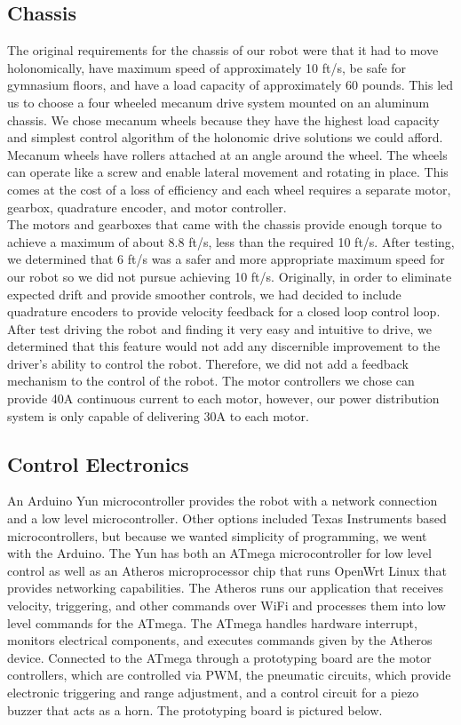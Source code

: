 \documentclass[letterpaper,12pt]{article}
\begin{document}
\subsection{Chassis}
The original requirements for the chassis of our robot were that it had to move 
holonomically, have maximum speed of approximately 10
ft/s, be safe for gymnasium floors, and have a load capacity of approximately
60 pounds. This led us to choose a four wheeled mecanum drive
system mounted on an aluminum chassis. We chose mecanum wheels because they
have the highest load capacity and simplest control algorithm of the holonomic
drive solutions we could afford. Mecanum wheels have rollers attached at an
angle around the wheel. The wheels can operate like a screw and enable lateral
movement and rotating in place. This comes at the cost of a loss of efficiency
and each wheel requires a separate motor, gearbox, quadrature encoder, and
motor controller.\\

The motors and gearboxes that came with the chassis provide enough
torque to achieve a maximum of about 8.8 ft/s, less than the required 
10 ft/s. After testing, we determined that 6 ft/s was a safer and more 
appropriate maximum speed for our robot so we did not pursue achieving 
10 ft/s.  Originally, in order to eliminate expected drift and provide
smoother controls, we had decided to include quadrature encoders to provide
velocity feedback for a closed loop control loop. After test driving the robot and 
finding it very easy and intuitive to drive, we determined that this feature would 
not add any discernible improvement to the driver's ability 
to control the robot. Therefore, we did not add a feedback mechanism to the 
control of the robot. The motor controllers we chose can provide 40A continuous 
current to each motor, however, our power
distribution system is only capable of delivering 30A to each motor.\\

\subsection{Control Electronics}
An Arduino Yun microcontroller provides the robot with a network
connection and a low level microcontroller. Other options included Texas
Instruments based microcontrollers, but because we wanted simplicity of
programming, we went with the Arduino. The Yun has both an ATmega
microcontroller for low level control as well as an Atheros microprocessor chip
that runs OpenWrt Linux that provides networking capabilities. The Atheros runs
our application that receives velocity, triggering, and other commands over
WiFi and processes them into low level commands for the ATmega. The ATmega
handles hardware interrupt, monitors electrical components, and executes
commands given by the Atheros device. Connected to the ATmega through a prototyping board are the motor
controllers, which are controlled via PWM, the pneumatic circuits,
which provide electronic triggering and range adjustment, and a control circuit for a piezo buzzer that acts as a horn. The prototyping board is pictured below.\\
\end{document}
